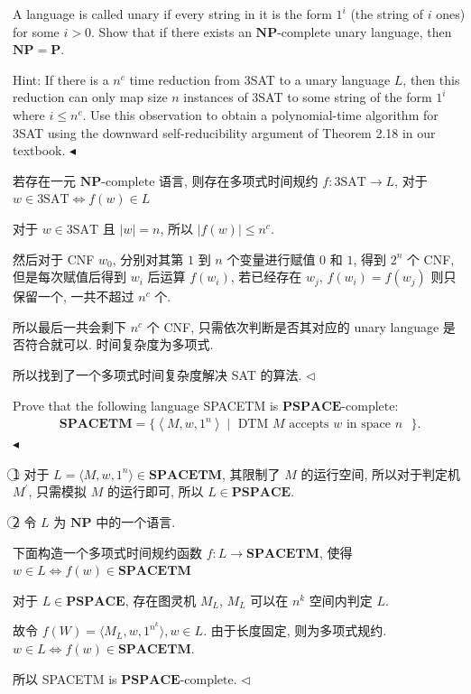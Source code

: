 \documentclass[11pt]{article}
\newcommand{\mP}{\mathbf{P}}
\newcommand{\NP}{\mathbf{NP}}
\newcommand{\NPC}{\mathbf{NP}\text{-complete}}
\newcommand{\PSPACE}{\mathbf{PSPACE}}
\newcommand{\PSPACEC}{\mathbf{PSPACE}\text{-complete}}
\newenvironment{problem}[2][Problem]{\begin{trivlist}
		\item[\hskip \labelsep {\bfseries #1}\hskip \labelsep {\bfseries #2.}]}{\hfill$\blacktriangleleft$\end{trivlist}}
\newenvironment{answer}[1][Answer]{\begin{trivlist}
		\item[\hskip \labelsep {\bfseries #1.}\hskip \labelsep]}{\hfill$\lhd$\end{trivlist}}
\begin{document}
	\begin{problem}{2.(16 points)}
		A language is called unary if every string in it is the form $1^i$ (the string of $i$ ones) for some $i > 0$. Show that if there exists an $\NP$-complete unary language, then $\NP = \mP$. 
		
		Hint: If there is a $n^c$ time reduction from 3SAT to a unary language $L$, then this reduction can only map size $n$ instances of 3SAT to some string of the form $1^i$ where $i \le n^c$. Use this observation to obtain a polynomial-time algorithm for 3SAT using the downward self-reducibility argument of Theorem 2.18 in our textbook.
	\end{problem}
	\begin{answer}
		若存在一元 $\NPC$ 语言, 则存在多项式时间规约 $f:\text{3SAT}\rightarrow L$, 对于 $w\in\text{3SAT}\Leftrightarrow f(w)\in L$
		
		对于 $w\in\text{3SAT}$ 且 $|w|=n$, 所以 $|f(w)|\leq n^c$.
		
		然后对于 CNF $w_0$, 分别对其第 $1$ 到 $n$ 个变量进行赋值 $0$ 和 $1$, 得到 $2^n$ 个 CNF, 但是每次赋值后得到 $w_i$ 后运算 $f(w_i)$, 若已经存在 $w_j$, $f(w_i)=f(w_j)$ 则只保留一个, 一共不超过 $n^c$ 个.
		
		所以最后一共会剩下 $n^c$ 个 CNF, 只需依次判断是否其对应的 unary language 是否符合就可以. 时间复杂度为多项式.
		
		所以找到了一个多项式时间复杂度解决 SAT 的算法.
	\end{answer}
	\begin{problem}{3.(16 points)}
		Prove that the following language SPACETM is $\PSPACEC$:
		\begin{align*}
			\textbf{SPACETM} = \{ \left\langle M, w, 1^n \right\rangle\mid\text{ DTM $M$ accepts $w$ in space $n$ }\}.
		\end{align*}
	\end{problem}
	\begin{answer}
		\textcircled{1} 对于 $L=\langle M, w, 1^n \rangle\in\textbf{SPACETM}$, 其限制了 $M$ 的运行空间, 所以对于判定机 $M^\prime$, 只需模拟 $M$ 的运行即可, 所以 $L\in\PSPACE$.
		
		\textcircled{2} 令 $L$ 为 $\NP$ 中的一个语言.
		
		下面构造一个多项式时间规约函数 $f:L\rightarrow\textbf{SPACETM}$, 使得 $w\in L\Leftrightarrow f(w)\in \textbf{SPACETM}$
		
		对于 $L\in\PSPACE$, 存在图灵机 $M_L$, $M_L$ 可以在 $n^k$ 空间内判定 $L$.
		
		故令 $f(W)=\langle M_L,w,1^{n^k}\rangle,w\in L$. 由于长度固定, 则为多项式规约. $w\in L\Leftrightarrow f(w)\in \textbf{SPACETM}$.
		
		所以 SPACETM is $\PSPACEC$.
	\end{answer}
\end{document}
